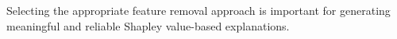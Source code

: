 



Selecting the appropriate feature removal approach is important for generating meaningful and reliable Shapley value-based explanations.